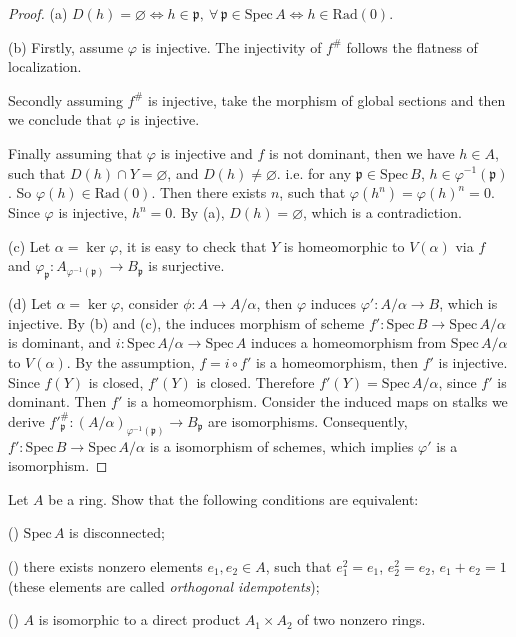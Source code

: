 \begin{proof}
	(a) $D(h)=\varnothing\iff h\in \mathfrak{p},\ \forall\, \mathfrak{p}\in \mathrm{Spec}\,A\iff h\in \mathrm{Rad}(0)$. 
	
	(b) Firstly, assume $\varphi$ is injective. The injectivity of $f^\#$ follows the flatness of localization.
	
	Secondly assuming $f^\#$ is injective, take the morphism of global sections and then we conclude that $\varphi$ is injective.
	
	Finally assuming that $\varphi$ is injective and $f$ is not dominant, then we have $h\in A$, such that $D(h)\cap Y=\varnothing$, and $D(h)\neq\varnothing$. i.e. for any $\mathfrak{p}\in \mathrm{Spec}\,B$, $h\in\varphi^{-1}(\mathfrak{p})$.
	So $\varphi(h)\in \mathrm{Rad}(0)$. Then there exists $n$, such that $\varphi(h^n)=\varphi(h)^n=0$. Since $\varphi$
	is injective, $h^n=0$. By (a), $D(h)=\varnothing$, which is a contradiction.
	
	(c) Let $\alpha=\ker\varphi$, it is easy to check that $Y$ is homeomorphic to $V(\alpha)$ via $f$ and
	$\varphi_\mathfrak{p}: A_{\varphi^{-1}(\mathfrak{p})}\longrightarrow B_\mathfrak{p}$ is surjective.
	
	(d) Let $\alpha=\ker\varphi$, consider $\phi:A\rightarrow A/\alpha$, then $\varphi$ induces $\varphi':A/\alpha \rightarrow B $,
	which is injective. By (b) and (c), the induces morphism of scheme $f':\mathrm{Spec}\,B\rightarrow \mathrm{Spec}\,A/\alpha$ is dominant, and
	$i:\mathrm{Spec}\,A/\alpha\rightarrow \mathrm{Spec}\,A$ induces a homeomorphism from $\mathrm{Spec}\,A/\alpha$ to $V(\alpha)$. By the assumption, $f=i\circ f'$ is
	a homeomorphism, then $f'$ is injective. Since $f(Y)$ is closed, $f'(Y)$ is closed. Therefore $f'(Y)=\mathrm{Spec}\,A/\alpha$, since $f'$ is dominant.
	Then $f'$ is a homeomorphism. Consider the induced maps on stalks we derive $f'^\#_\mathfrak{p}:(A/\alpha)_{\varphi^{-1}(\mathfrak{p})}\rightarrow B_\mathfrak{p}$ are isomorphisms.
	Consequently, $f': \mathrm{Spec}\,B \rightarrow \mathrm{Spec}\,A/\alpha$ is a isomorphism of schemes, which implies $\varphi'$ is a isomorphism.
\end{proof}

\begin{exe}
	\label{2.2.19}
	Let $A$ be a ring. Show that the following conditions are equivalent:
	
	\textup{()} $\mathrm{Spec}\,A$ is disconnected;
	
	\textup{()} there exists nonzero elements $ e_1,e_2\in A$, such that $e_1^2=e_1$, $e_2^2=e_2$, $e_1+e_2=1$ (these elements are called \emph{orthogonal idempotents});
	
	\textup{()} $A$ is isomorphic to a direct product $A_1\times A_2$ of two nonzero rings.
\end{exe}

